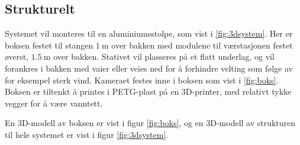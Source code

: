 \newpage
\subsection{Strukturelt}\label{sec:impl:struktur}

Systemet vil monteres til en aluminiumsstolpe, som vist i \autoref{fig:3dsystem}. 
Her er boksen festet til stangen $\SI{1}{\meter}$ over bakken med modulene til værstasjonen festet øverst, $\SI{1.5}{\meter}$ over bakken. 
Stativet vil plasseres på et flatt underlag, og vil forankres i bakken med vaier eller veies ned for å forhindre velting som følge av for eksempel sterk vind.
Kameraet festes inne i boksen som vist i \autoref{fig:boks}.
Boksen er tiltenkt å printes i PETG-plast på en 3D-printer, med relativt tykke vegger for å være vanntett. 

En 3D-modell av boksen er vist i figur \ref{fig:boks}, og en 3D-modell av strukturen til hele systemet er vist i figur \ref{fig:3dsystem}.

